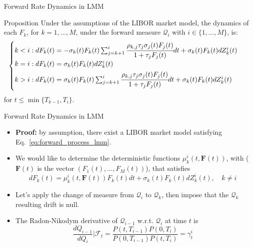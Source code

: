 \documentclass{beamer}
\begin{document}
\begin{frame}{Forward Rate Dynamics in LMM}
	\begin{block}{Proposition}
		Under the assumptions of the LIBOR market model, the dynamics of each $F_k$, for $k = 1,\ldots, M$, under the forward measure $\mathcal{Q}_i$ with $i \in \{1,\ldots, M\}$, is:
		\begin{equation*}
			\begin{cases}
				k < i: dF_k(t) = -\sigma_k(t)F_k(t)\sum_{j=k+1}^i\cfrac{\rho_{k,j}\tau_j\sigma_j(t)F_j(t)}{1+\tau_jF_j(t)}dt + \sigma_k(t)F_k(t)dZ^i_k(t) \\ \vspace{0.1cm}
				k = i : dF_k(t) = \sigma_k(t)F_k(t)dZ_k^i(t) \\
				\vspace{0.1cm}
				k > i : dF_k(t) = \sigma_k(t)F_k(t)\sum_{j=k+1}^i\cfrac{\rho_{k,j}\tau_j\sigma_j(t)F_j(t)}{1+\tau_jF_j(t)}dt + \sigma_k(t)F_k(t)dZ^i_k(t)		
			\end{cases}
		\end{equation*}
		for $t \le \min\{T_{k-1}, T_i\}$.
	\end{block}
\end{frame}

\begin{frame}{Forward Rate Dynamics in LMM}
	\begin{itemize}
	\item \textbf{Proof:} by assumption, there exist a LIBOR market model satisfying Eq.~\ref{eq:forward_process_lmm}.
	\item We would like to determine the deterministic functions $\mu_k^i(t, \mathbf{F}(t))$, with ($\mathbf{F}(t)$ is the vector $(F_1(t),\ldots, F_M(t))$), that satisfies
	\begin{equation}
		dF_k(t) = \mu_k^i(t, \mathbf{F}(t))F_k(t)dt + \sigma_k(t)F_k(t)dZ^i_k(t),\quad k\neq i
		\label{eq:forward_dynamics_in_lfm}
	\end{equation}
	\item Let's apply the change of measure from $\mathcal{Q}_i$ to $\mathcal{Q}_k$, then impose that the $\mathcal{Q}_k$ resulting drift is null. 
	\item The Radon-Nikodym derivative of $\mathcal{Q}_{i-1}$ w.r.t. $\mathcal{Q}_i$ at time $t$ is
	\begin{equation*}
		\frac{dQ_{i-1}}{dQ_i}|\mathcal{F}_t = \frac{P(t, T_{i-1})P(0, T_i)}{P(0, T_{i-1})P(t, T_i)} = \gamma^i_t
	\end{equation*}
	\end{itemize}
\end{frame}
\end{document}
